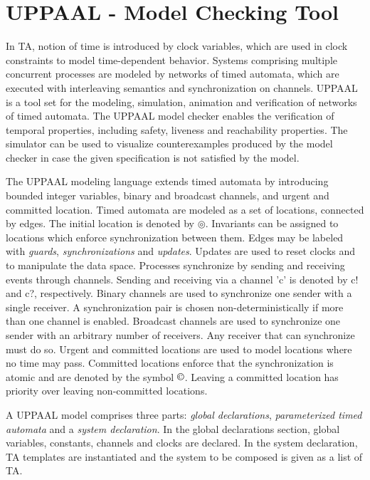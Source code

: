 \documentclass[letterpaper]{article}
\begin{document}
\section{UPPAAL - Model Checking Tool}
\label{4}
In TA, notion of time is introduced by clock variables, which are used in clock constraints to model time-dependent behavior. Systems comprising multiple concurrent processes are modeled by networks of timed automata, which are executed with interleaving semantics and synchronization on channels. UPPAAL  is a tool set for the modeling, simulation, animation and verification of networks of timed automata. The UPPAAL model checker enables the verification of temporal properties, including safety, liveness and reachability properties. The simulator can be used to visualize counterexamples produced by the model checker in case the given specification is not satisfied by the model.
\par The UPPAAL modeling language extends timed automata by introducing bounded integer variables, binary and broadcast channels, and urgent and committed location. Timed automata are modeled as a set of locations, connected by edges. The initial location is denoted by $\circledcirc$. Invariants can be assigned to locations which enforce synchronization between them. Edges may be labeled with \textit{guards}, \textit{synchronizations} and \textit{updates}. Updates are used to reset clocks and to manipulate the data space. Processes synchronize by sending and receiving events through channels. Sending and receiving via a channel 'c' is denoted by c! and c?, respectively. Binary channels are used to synchronize one sender with a single receiver. A synchronization pair is chosen non-deterministically if more than one channel is enabled. Broadcast channels are used to synchronize one sender with an arbitrary number of receivers. Any receiver that can synchronize must do so. Urgent and committed locations are used to model locations where no time may pass. Committed locations enforce that the synchronization is atomic and are denoted by the symbol $\copyright$. Leaving a committed location has priority over leaving non-committed locations.
\par A UPPAAL model comprises three parts: \textit{global declarations}, \textit{parameterized timed automata} and a \textit{system declaration}. In the global declarations section, global variables, constants, channels and clocks are declared. In the system declaration, TA templates are instantiated and the system to be composed is given as a list of TA.
\end{document}
